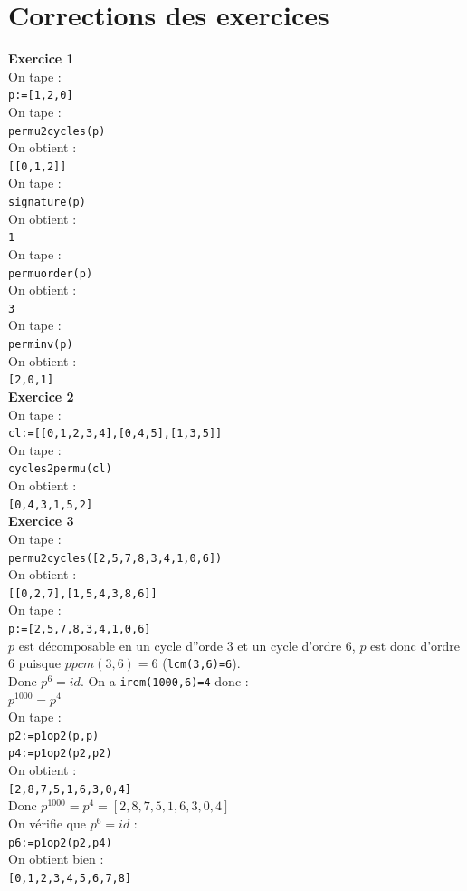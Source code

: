 \documentclass[a4paper,11pt]{book}
\begin{document}
\section{Corrections des exercices} \label{sec:corexoperm}
{\bf Exercice 1}\\
On tape :\\
{\tt p:=[1,2,0]}\\
On tape :\\
{\tt permu2cycles(p)}\\
On obtient :\\
{\tt [[0,1,2]]}\\
On tape :\\
{\tt signature(p)}\\
On obtient :\\
{\tt 1}\\
On tape :\\
{\tt permuorder(p)}\\
On obtient :\\
{\tt 3}\\
On tape :\\
{\tt perminv(p)}\\
On obtient :\\
{\tt [2,0,1]}\\

{\bf Exercice 2}\\
On tape :\\
{\tt cl:=[[0,1,2,3,4],[0,4,5],[1,3,5]] }\\
On tape :\\
{\tt cycles2permu(cl)}\\
On obtient :\\
{\tt [0,4,3,1,5,2]}\\

{\bf Exercice 3}\\
On tape :\\
{\tt permu2cycles([2,5,7,8,3,4,1,0,6])}\\
On obtient :\\
{\tt [[0,2,7],[1,5,4,3,8,6]]}\\
On tape :\\
{\tt p:=[2,5,7,8,3,4,1,0,6]}\\
$p$ est d\'ecomposable en un cycle d''orde 3 et un cycle d'ordre 6, $p$ est donc d'ordre 6 puisque $ppcm(3,6)=6$ ({\tt lcm(3,6)=6}).\\
Donc $p^6=id$. On a {\tt irem(1000,6)=4} donc :\\
$p^{1000}=p^4$\\
On tape :\\
{\tt p2:=p1op2(p,p)}\\
 {\tt p4:=p1op2(p2,p2)}\\
On obtient :\\
{\tt [2,8,7,5,1,6,3,0,4]}\\
Donc $p^{1000}=p^4=  [2,8,7,5,1,6,3,0,4]$\\
On v\'erifie que $p^6=id$ :\\
{\tt p6:=p1op2(p2,p4)}\\
On obtient bien :\\
{\tt [0,1,2,3,4,5,6,7,8]}\\
\end{document}
